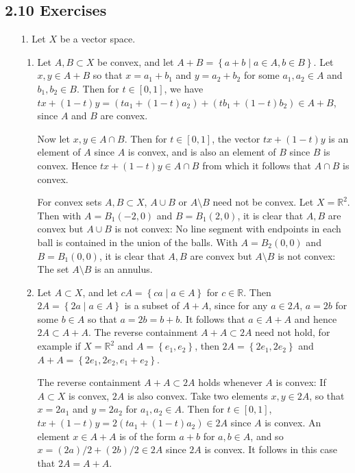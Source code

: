 \documentclass[11pt,leqno]{article}
\theoremstyle{plain}
\theoremstyle{definition}
\numberwithin{equation}{section}
\numberwithin{lem}{section}
\newcommand{\cbr}[1]{\left\{#1\right\}}
\begin{document}
\subsection*{2.10 Exercises}
\begin{enumerate}
  \item[1.] Let $X$ be a vector space.
  \begin{enumerate}
    \item Let $A,B\subset X$ be convex, and let $A+B = \cbr{a+b\mid a\in A,b\in B}$. Let $x,y\in A+B$ so that $x = a_1+b_1$ and $y = a_2+b_2$ for some $a_1,a_2\in A$ and $b_1,b_2\in B$. Then for $t\in [0,1]$, we have $tx+(1-t)y = (ta_1 + (1-t)a_2) + (tb_1 + (1-t)b_2)\in A+B$, since $A$ and $B$ are convex.
    
    Now let $x,y\in A\cap B$. Then for $t\in [0,1]$, the vector $tx + (1-t)y$ is an element of $A$ since $A$ is convex, and is also an element of $B$ since $B$ is convex. Hence $tx + (1-t)y\in A\cap B$ from which it follows that $A\cap B$ is convex.

    For convex sets $A,B\subset X$, $A\cup B$ or $A\setminus B$ need not be convex. Let $X = \mathbb R^2$. Then with $A = B_1(-2,0)$ and $B = B_1(2,0)$, it is clear that $A,B$ are convex but $A\cup B$ is not convex: No line segment with endpoints in each ball is contained in the union of the balls. With $A = B_2(0,0)$ and $B = B_1(0,0)$, it is clear that $A,B$ are convex but $A\setminus B$ is not convex: The set $A\setminus B$ is an annulus.

    \item Let $A\subset X$, and let $cA = \cbr{ca\mid a\in A}$ for $c\in \mathbb R$. Then $2A = \cbr{2a\mid a\in A}$ is a subset of $A + A$, since for any $a\in 2A$, $a = 2b$ for some $b\in A$ so that $a = 2b = b+b$. It follows that $a \in A+A$ and hence $2A\subset A + A$. The reverse containment $A + A\subset 2A$ need not hold, for example if $X = \mathbb R^2$ and $A = \cbr{e_1,e_2}$, then $2A = \cbr{2e_1,2e_2}$ and $A + A =\cbr{2e_1, 2e_2, e_1 + e_2}$.
    
    The reverse containment $A + A\subset 2A$ holds whenever $A$ is convex: If $A\subset X$ is convex, $2A$ is also convex. Take two elements $x,y\in 2A$, so that $x = 2a_1$ and $y = 2a_2$ for $a_1,a_2\in A$. Then for $t\in [0,1]$, $tx+(1-t)y = 2(ta_1 + (1-t)a_2)\in 2A$ since $A$ is convex. An element $x \in A+A$ is of the form $a+b$ for $a,b\in A$, and so $x = (2a)/2 + (2b)/2\in 2A$ since $2A$ is convex. It follows in this case that $2A = A + A$.
  \end{enumerate}


\end{enumerate}
\end{document}
